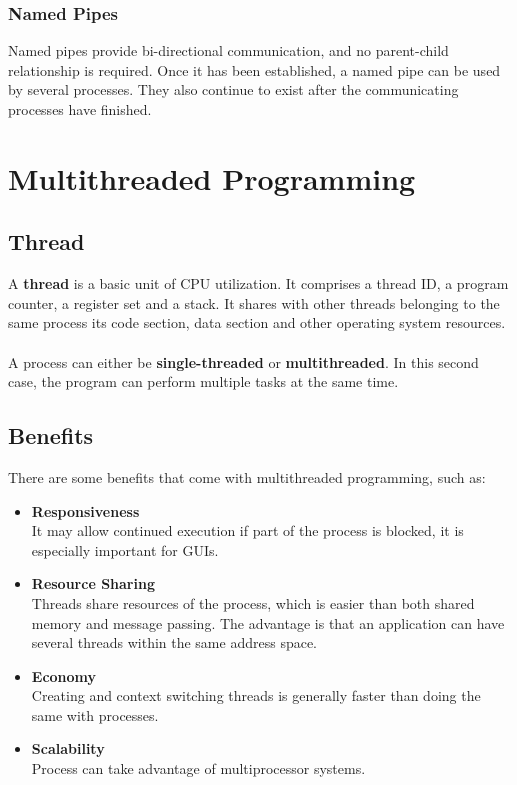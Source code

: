 \documentclass{article}
\begin{document}
\subsubsection{Named Pipes}
Named pipes provide bi-directional communication, and no parent-child relationship is required. Once it has been established, a named pipe can be used by several processes. They also continue to exist after the communicating processes have finished.

\section{Multithreaded Programming}
\subsection{Thread}
A \textbf{thread} is a basic unit of CPU utilization. It comprises a thread ID, a program counter, a register set and a stack. It shares with other threads belonging to the same process its code section, data section and other operating system resources. \\ \\
A process can either be \textbf{single-threaded} or \textbf{multithreaded}. In this second case, the program can perform multiple tasks at the same time.

\subsection{Benefits}
There are some benefits that come with multithreaded programming, such as:

\begin{itemize}
	\item \textbf{Responsiveness}
	\vspace{.2cm} \\
	It may allow continued execution if part of the process is blocked, it is especially important for GUIs.
	
	\item \textbf{Resource Sharing}
	\vspace{.2cm} \\
	Threads share resources of the process, which is easier than both shared memory and message passing. The advantage is that an application can have several threads within the same address space.
	
	\item \textbf{Economy}
	\vspace{.2cm} \\
	Creating and context switching threads is generally faster than doing the same with processes.
	
	\item \textbf{Scalability}
	\vspace{.2cm} \\
	Process can take advantage of multiprocessor systems.
\end{itemize}
\end{document}
